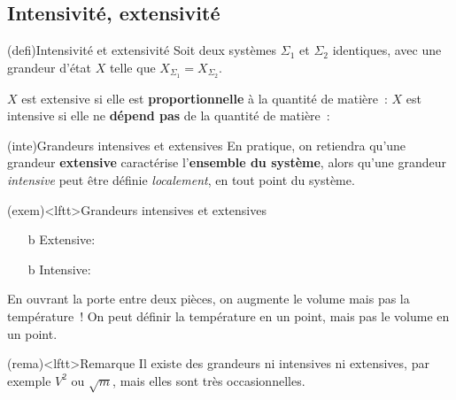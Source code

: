 \documentclass[../../main/main.tex]{subfiles}
\begin{document}
\subsection{Intensivité, extensivité}
\begin{tcb*}(defi){Intensivité et extensivité}
	Soit deux systèmes $\Sigma_1$ et $\Sigma_2$ identiques, avec une grandeur
	d'état $X$ telle que $X_{\Sigma_1} = X_{\Sigma_2}$.
	\smallbreak
	\begin{isd}
		$X$ est extensive si elle est \textbf{proportionnelle} à la quantité de
		matière~:
		\psw{%
			\[
				X_{\Sigma_1 + \Sigma_2} = X_{\Sigma_1} + X_{\Sigma_2} = 2 X_{\Sigma_1}
			\]
		}%
		\vspace{-15pt}
		\tcblower
		$X$ est intensive si elle ne \textbf{dépend pas} de la quantité de
		matière~:
		\psw{%
			\[
				X_{\Sigma_1 + \Sigma_2} = X_{\Sigma_1} = X_{\Sigma_2}
			\]
		}%
		\vspace{-15pt}
	\end{isd}
\end{tcb*}

\begin{tcb}(inte){Grandeurs intensives et extensives}
	En pratique, on retiendra qu'une grandeur \textbf{extensive} caractérise
	l'\textbf{ensemble du système}, alors qu'une grandeur \textit{intensive} peut
	être définie \textit{localement}, en tout point du système.
\end{tcb}

\begin{tcb}(exem)<lftt>{Grandeurs intensives et extensives}
	\begin{itemize}
		\item[b]{Extensive}: 
		\item[b]{Intensive}: 
	\end{itemize}
	En ouvrant la porte entre deux pièces, on augmente le volume mais pas la
	température~! On peut définir la température en un point, mais pas le volume
	en un point.
\end{tcb}

\begin{tcn}(rema)<lftt>{Remarque}
	Il existe des grandeurs ni intensives ni extensives, par exemple $V^2$ ou
	$\sqrt{m}$, mais elles sont très occasionnelles.
\end{tcn}
\end{document}
